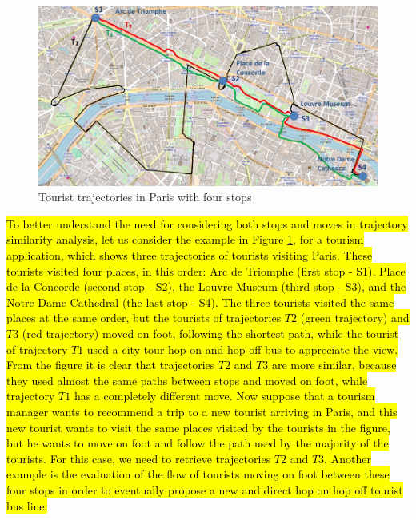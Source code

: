 \documentclass[12pt]{article}
\begin{document}
\begin{figure}[h]
\label{fig:Paris}
\centering
\includegraphics[width=1.0\textwidth]{Images/paris5.jpg}
\caption{Tourist trajectories in Paris with four stops}
\end{figure}


\hl{To better understand the need for considering both stops and moves in trajectory similarity analysis, let us consider the example in Figure {\ref{fig:Paris}}, for a tourism application, which shows three trajectories of tourists visiting Paris. These tourists visited four places, in this order:  Arc de Triomphe (first stop - S1), Place de la Concorde (second stop - S2), the Louvre Museum (third stop - S3), and the Notre Dame Cathedral (the last stop - S4). The three tourists visited the same places at the same order, but the tourists of trajectories $T2$ (green trajectory) and $T3$ (red trajectory) moved on foot, following the shortest path, while the tourist of trajectory $T1$ used a city tour hop on and hop off bus to appreciate the view. From the figure it is clear that trajectories $T2$ and $T3$ are more similar, because they used almost the same paths between stops and moved on foot, while trajectory $T1$ has a completely different move. Now suppose that a tourism manager wants to recommend a trip to a new tourist arriving in Paris, and this new tourist wants to visit the same places visited by the tourists in the figure, but he wants to move on foot and follow the path used by the majority of the tourists.
For this case, we need to retrieve trajectories $T2$ and $T3$. 
Another example is the evaluation of the flow of tourists moving on foot between these four stops in order to eventually propose a new and direct hop on hop off tourist bus line.}
\end{document}
